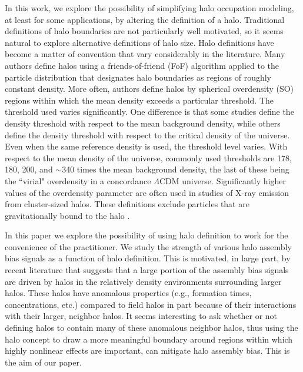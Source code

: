 \documentclass[usenatbib,usegraphicx,letterpaper]{mn2e}
\begin{document}
In this work, we explore the possibility of simplifying halo occupation modeling, at least for some 
applications, by altering the definition of a halo. Traditional definitions of halo boundaries are 
not particularly well motivated, so it seems natural to explore alternative definitions of halo size. 
Halo definitions have become a matter of convention that vary considerably in the literature. Many 
authors define halos using a friends-of-friend (FoF) algorithm applied to the particle distribution that designates 
halo boundaries as regions of roughly constant density. More often, authors define halos by spherical 
overdensity (SO) regions within which the mean density exceeds a particular threshold. The threshold used 
varies significantly. One difference is that some studies define the density threshold with respect to the 
mean background density, while others define the density threshold with respect to the critical density of 
the universe. Even when the same reference density is used, the threshold level varies. With respect to the 
mean density of the universe, commonly used thresholds are 178, 180, 200, and $\sim$340 times the mean 
background density, the last of these being the ``virial" overdensity in a concordance $\Lambda$CDM universe. 
Significantly higher values of the overdensity parameter are often used in studies of X-ray emission from cluster-sized halos. 
These definitions exclude particles that are gravitationally bound to the halo \citep[e.g.,][]{kazan06}. 


In this paper we explore the possibility of using halo definition to work for the 
convenience of the practitioner. We study the strength of various halo assembly bias signals 
as a function of halo definition. This is motivated, in large part, by recent literature that suggests 
that a large portion of the assembly bias signals are driven by halos in the relatively density environments 
surrounding larger halos.  
These halos have anomalous properties (e.g., formation times, concentrations, etc.) compared to field halos 
in part because of their interactions with their larger, neighbor halos. It seems interesting to ask whether or 
not defining halos to contain many of these anomalous neighbor halos, thus using the halo concept to draw a 
more meaningful boundary around regions within which highly nonlinear effects are important, can mitigate 
halo assembly bias. This is the aim of our paper. 
\end{document}
